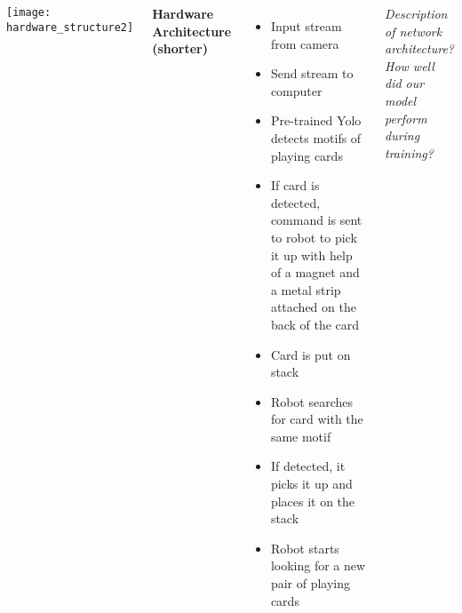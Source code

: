 \documentclass[25pt, a0paper, landscape]{tikzposter}
\begin{document}
\begin{columns}
{ 				\begin{minipage}{\columnwidth}
 					\begin{minipage}{800 pt}
			  	    	\begin{tikzfigure}
			  	    		\texttt{[image: hardware\_structure2]}
			  	    	\end{tikzfigure}
 					\end{minipage}
 					\hspace{50 pt}
 					\begin{minipage}{500 pt}
 						\bfseries{Hardware Architecture (shorter)}
 						\normalfont
 						\begin{itemize}
			    		\item Input stream from camera
			    		\item Send stream to computer
			    		\item Pre-trained Yolo detects motifs of playing cards
			    		\item If card is detected, command is sent to robot to pick it up with help of a magnet and a metal strip attached on the back of the card
			    		\item Card is put on stack
			    		\item Robot searches for card with the same motif
			    		\item If detected, it picks it up and places it on the stack
			    		\item Robot starts looking for a new pair of playing cards
 						\end{itemize}
 					\end{minipage}
 				\end{minipage}
    	    

    	\textit{Description of network architecture?} \textit{How well did our model perform during training?}
    	
    }
\end{columns}
\end{document}
